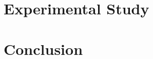 \section{Experimental Study}
\label{sec:Experimental}


\section{Conclusion}
\label{sec:Conclusion}


%
%


